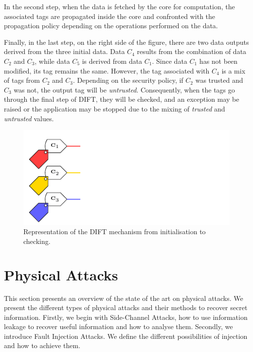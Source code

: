 In the second step, when the data is fetched by the core for computation, the associated tags are propagated inside the core and confronted with the propagation policy depending on the operations performed on the data.

Finally, in the last step, on the right side of the figure, there are two data outputs derived from the three initial data. Data $C_4$ results from the combination of data $C_2$ and $C_3$, while data $C_5$ is derived from data $C_1$. Since data $C_1$ has not been modified, its tag remains the same. However, the tag associated with $C_4$ is a mix of tags from $C_2$ and $C_3$. Depending on the security policy, if $C_2$ was trusted and $C_3$ was not, the output tag will be \textit{untrusted}. Consequently, when the tags go through the final step of DIFT, they will be checked, and an exception may be raised or the application may be stopped due to the mixing of \textit{trusted} and \textit{untrusted} values.

\begin{figure}[ht]
    \centering
    \includegraphics[page=3]{c2_soa/img/schemaDIFT.pdf}
    \caption{Representation of the DIFT mechanism from initialisation to checking.}
    \label{fig:dift_init}
\end{figure}

\section{Physical Attacks}
\label{section:physicalAttacks}

This section presents an overview of the state of the art on physical attacks. We present the different types of physical attacks and their methods to recover secret information. Firstly, we begin with Side-Channel Attacks, how to use information leakage to recover useful information and how to analyse them.
Secondly, we introduce Fault Injection Attacks. We define the different possibilities of injection and how to achieve them.

